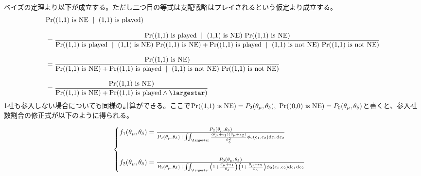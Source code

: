 \documentclass{jsarticle}
\begin{document}
ベイズの定理より以下が成立する。ただし二つ目の等式は支配戦略はプレイされるという仮定より成立する。
\begin{align*}
	&{\rm Pr}(\text{(1,1) is NE}\ \mid\ \text{(1,1) is played}) \\[8pt]
	&= \frac{{\rm Pr}(\text{(1,1) is played}\ \mid\ \text{(1,1) is NE})\ {\rm Pr}(\text{(1,1) is NE})}{{\rm Pr}(\text{(1,1) is played}\ \mid\ \text{(1,1) is NE})\ {\rm Pr}(\text{(1,1) is NE}) + {\rm Pr}(\text{(1,1) is played}\ \mid\ \text{(1,1) is not NE})\ {\rm Pr}(\text{(1,1) is not NE})}\\[8pt]
	&= \frac{{\rm Pr}(\text{(1,1) is NE})}{{\rm Pr}(\text{(1,1) is NE}) + {\rm Pr}(\text{(1,1) is played}\ \mid\ \text{(1,1) is not NE})\ {\rm Pr}(\text{(1,1) is not NE})}\\[8pt]
	&= \frac{{\rm Pr}(\text{(1,1) is NE})}{{\rm Pr}(\text{(1,1) is NE}) + {\rm Pr}(\text{(1,1) is played} \wedge \largestar)}
\end{align*}
1社も参入しない場合についても同様の計算ができる。ここで${\rm Pr}(\text{(1,1) is NE}) = P_2(\theta_{\mu}, \theta_{\delta}),\ {\rm Pr}(\text{(0,0) is NE}) = P_0(\theta_{\mu}, \theta_{\delta})$と書くと、参入社数割合の修正式が以下のように得られる。

\begin{align*}
\begin{cases}
	f_1(\theta_{\mu}, \theta_{\delta}) = \frac{P_2(\theta_{\mu}, \theta_{\delta})}{P_2(\theta_{\mu}, \theta_{\delta}) + \iint_{\largestar} \frac{(\theta_{\mu}+\epsilon_1)(\theta_{\mu} + \epsilon_2)}{\theta_{\delta}^2} \phi_2(\epsilon_1, \epsilon_2) \mathrm{d}\epsilon_1 \mathrm{d}\epsilon_2}\\[30pt]
	f_2(\theta_{\mu}, \theta_{\delta}) = \frac{P_0(\theta_{\mu}, \theta_{\delta})}{P_0(\theta_{\mu}, \theta_{\delta}) + \iint_{\largestar} \left( 1 + \frac{\theta_{\mu} + \epsilon_1}{\theta_{\delta}} \right) \left( 1 + \frac{\theta_{\mu} + \epsilon_2}{\theta_{\delta}} \right) \phi_2(\epsilon_1, \epsilon_2) \mathrm{d}\epsilon_1 \mathrm{d}\epsilon_2}
\end{cases}
\end{align*}
\end{document}
